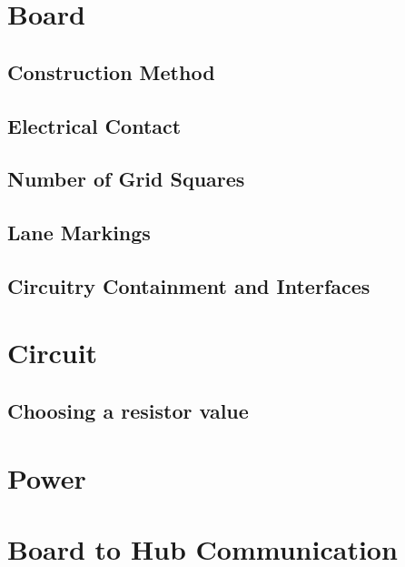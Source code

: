 	
    
\section{Board}
\label{sec:board}

\subsection{Construction Method}
\subsection{Electrical Contact}
\subsection{Number of Grid Squares}
\subsection{Lane Markings}
\subsection{Circuitry Containment and Interfaces}

    
\section{Circuit}


\subsection{Choosing a resistor value}




\section{Power}
    

\section{Board to Hub Communication}

    
    
    
    
    